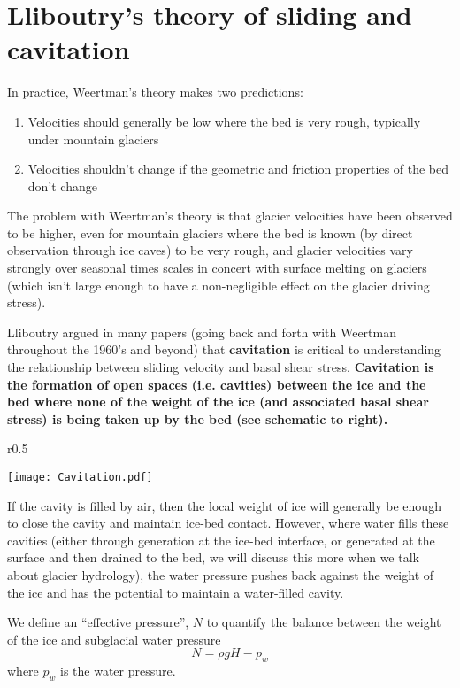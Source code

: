 \documentclass[12pt]{article}
\theoremstyle{definition}
\begin{document}
\section{Lliboutry's theory of sliding and cavitation}

In practice, Weertman's theory makes two predictions:
\begin{enumerate}
\item Velocities should generally be low where the bed is very rough, typically under mountain glaciers
\item Velocities shouldn't change if the geometric and friction properties of the bed don't change
\end{enumerate}
The problem with Weertman's theory is that glacier velocities have been observed to be higher, even for mountain glaciers where the bed is known (by direct observation through ice caves) to be very rough, and glacier velocities vary strongly over seasonal times scales in concert with surface melting on glaciers (which isn't large enough to have a non-negligible effect on the glacier driving stress).

Lliboutry argued in many papers (going back and forth with Weertman throughout the 1960's and beyond) that \textbf{cavitation} is critical to understanding the relationship between sliding velocity and basal shear stress. \textbf{Cavitation is the formation of open spaces (i.e. cavities) between the ice and the bed where none of the weight of the ice (and associated basal shear stress) is being taken up by the bed (see schematic to right).}
\begin{wrapfigure}{r}{0.5\textwidth}
  \begin{center}
\texttt{[image: Cavitation.pdf]}
  \end{center}
  \vspace{-20pt}
\end{wrapfigure}

If the cavity is filled by air, then the local weight of ice will generally be enough to close the cavity and maintain ice-bed contact. However, where water fills these cavities (either through generation at the ice-bed interface, or generated at the surface and then drained to the bed, we will discuss this more when we talk about glacier hydrology), the water pressure pushes back against the weight of the ice and has the potential to maintain a water-filled cavity.

We define an ``effective pressure'', $N$ to quantify the balance between the weight of the ice and subglacial water pressure
\begin{equation}
N = \rho g H - p_w
\end{equation}
where $p_w$ is the water pressure.
\end{document}

